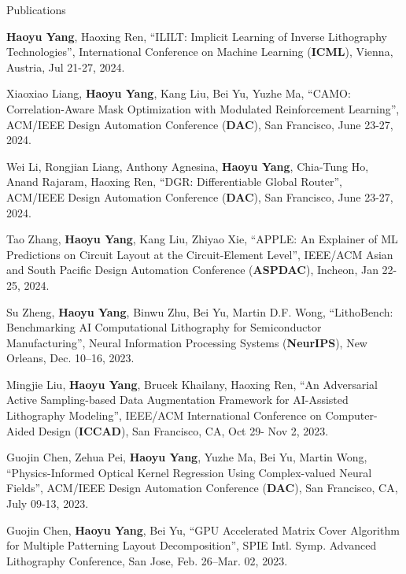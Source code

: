 \begin{rSection}{Publications}
\begin{description}[font=\normalfont]
	\item[{[C34]}] \textbf{Haoyu Yang}, Haoxing Ren, ``ILILT: Implicit Learning of Inverse Lithography Technologies'', International Conference on Machine Learning (\textbf{ICML}), Vienna, Austria, Jul 21-27, 2024.
	
	\item[{[C33]}] Xiaoxiao Liang, \textbf{Haoyu Yang}, Kang Liu, Bei Yu, Yuzhe Ma, ``CAMO: Correlation-Aware Mask Optimization with Modulated Reinforcement Learning'', ACM/IEEE Design Automation Conference (\textbf{DAC}), San Francisco, June 23-27, 2024.
	
	\item[{[C32]}]	Wei Li, Rongjian Liang, Anthony Agnesina, \textbf{Haoyu Yang}, Chia-Tung Ho, Anand Rajaram, Haoxing Ren, ``DGR: Differentiable Global Router'', ACM/IEEE Design Automation Conference (\textbf{DAC}), San Francisco, June 23-27, 2024.
	
	\item[{[C31]}] Tao Zhang, \textbf{Haoyu Yang}, Kang Liu, Zhiyao Xie, ``APPLE: An Explainer of ML Predictions on Circuit Layout at the Circuit-Element Level'', IEEE/ACM Asian and South Pacific Design Automation Conference (\textbf{ASPDAC}), Incheon, Jan 22-25, 2024.
	
	
	\item[{[C30]}] Su Zheng, \textbf{Haoyu Yang}, Binwu Zhu, Bei Yu, Martin D.F. Wong, ``LithoBench: Benchmarking AI Computational Lithography for Semiconductor Manufacturing'', Neural Information Processing Systems (\textbf{NeurIPS}), New Orleans, Dec. 10–16, 2023.
	
		
	\item[{[C29]}] Mingjie Liu, \textbf{Haoyu Yang}, Brucek Khailany, Haoxing Ren, ``An Adversarial Active Sampling-based Data Augmentation Framework for AI-Assisted Lithography Modeling'', IEEE/ACM International Conference on Computer-Aided Design (\textbf{ICCAD}), San Francisco, CA, Oct 29- Nov 2, 2023.
	
	\item[{[C28]}] Guojin Chen, Zehua Pei, \textbf{Haoyu Yang}, Yuzhe Ma, Bei Yu, Martin Wong, ``Physics-Informed Optical Kernel Regression Using Complex-valued Neural Fields'', ACM/IEEE Design Automation Conference (\textbf{DAC}), San Francisco, CA, July 09-13, 2023.
	
		
	\item[{[C27]}] Guojin Chen, \textbf{Haoyu Yang}, Bei Yu, ``GPU Accelerated Matrix Cover Algorithm for Multiple Patterning Layout Decomposition'', SPIE Intl. Symp. Advanced Lithography Conference, San Jose, Feb. 26–Mar. 02, 2023.


\end{description}
\end{rSection}
